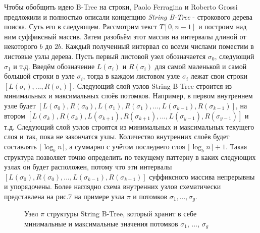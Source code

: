 \documentclass[a4paper,12pt]{article}
\begin{document}
Чтобы обобщить идею B-Tree на строки, Paolo Ferragina и Roberto Grossi \cite{ferragina1999string} предложили и полностью описали концепцию \textit{String B-Tree} - строкового дерева поиска. Суть его в следующем. Рассмотрим текст $T[0, n-1]$ и построим над ним суффиксный массив. Затем разобьём этот массив на интервалы длиной от некоторого $b$ до $2b$. Каждый полученный интервал со всеми числами поместим в листовые узлы дерева. Пусть первый листовой узел обозначается $\sigma_0$, следующий $\sigma_1$ и т.д. Введём обозначение $L(\sigma_i)$ и $R(\sigma_i)$ для самой маленькой и самой большой строки в узле $\sigma_i$, тогда в каждом листовом узле $\sigma_i$ лежат свои строки $[L(\sigma_i),...,R(\sigma_i)]$. Следующий слой узлов String B-Tree строится из минимальных и максимальных слоёв потомков. Например, в первом внутреннем узле будет $[L(\sigma_0), R(\sigma_0),L(\sigma_1), R(\sigma_1),...,L(\sigma_{k-1}), R(\sigma_{k-1})]$, на втором $[L(\sigma_k), R(\sigma_k),L(\sigma_{k+1}), R(\sigma_{k+1}),...,L(\sigma_{y-1}), R(\sigma_{y-1})]$ и т.д. Следующий слой узлов строятся из минимальных и максимальных текущего слоя и так, пока не закончатся узлы. Количество внутренних слоёв будет составлять $\lceil \log_b{n} \rceil$, а суммарно с учётом последнего слоя $\lceil \log_b{n} \rceil + 1$. Такая структура позволяет точно определить по текущему паттерну в каких следующих узлах он будет расположен, потому что эти интервалы $[L(\sigma_0), R(\sigma_0),...,L(\sigma_{k-1}), R(\sigma_{k-1})]$ суффиксного массива непрерывны и упорядочены. Более наглядно схема внутренних узлов схематически представлена на рис.7 на примере узла $\pi$ и потомков $\sigma_1, ..., \sigma_g$.

\begin{figure}[h!]
\caption{Узел $\pi$ структуры String B-Tree, который хранит в себе минимальные и максимальные значения потомков $\sigma_1$, ..., $\sigma_g$}
\end{figure}
\end{document}
